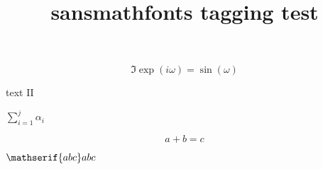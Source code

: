 \documentclass{article}
\title{sansmathfonts tagging test}
\begin{document}
\[\Im \mathop{\mathrm{exp}}(i\omega)=\sin(\omega) \]

text I\textsf{I}

$\sum_{i=1}^j\alpha_i$

\[a+b=c\]

$\mathserif{abc}abc$
\end{document}
